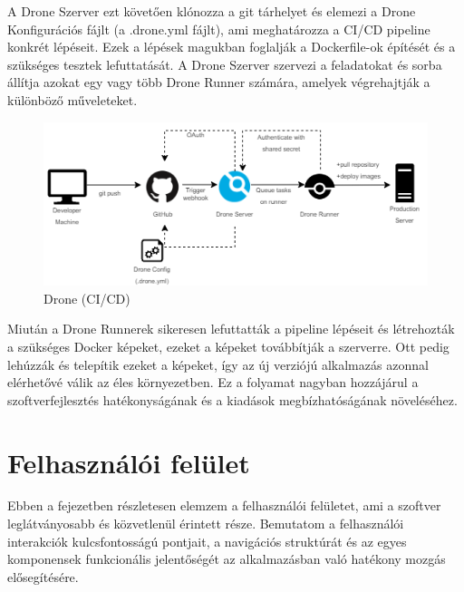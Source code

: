A Drone Szerver ezt követően klónozza a git tárhelyet és elemezi a Drone Konfigurációs fájlt (a .drone.yml fájlt), ami meghatározza a CI/CD pipeline konkrét lépéseit. Ezek a lépések magukban foglalják a Dockerfile-ok építését és a szükséges tesztek lefuttatását. A Drone Szerver szervezi a feladatokat és sorba állítja azokat egy vagy több Drone Runner számára, amelyek végrehajtják a különböző műveleteket.

\begin{figure}[H]
    \centering
    \includegraphics[width=15.0truecm]{images/droneCI.png}
    \caption{Drone (CI/CD)}
    \label{fig:Drone(CI/CD)}
\end{figure}

Miután a Drone Runnerek sikeresen lefuttatták a pipeline lépéseit és létrehozták a szükséges Docker képeket, ezeket a képeket továbbítják a szerverre. Ott pedig lehúzzák és telepítik ezeket a képeket, így az új verziójú alkalmazás azonnal elérhetővé válik az éles környezetben. Ez a folyamat nagyban hozzájárul a szoftverfejlesztés hatékonyságának és a kiadások megbízhatóságának növeléséhez.
\section{Felhaszn\'al\'oi felület}
Ebben a fejezetben részletesen elemzem a felhasználói felületet, ami a szoftver leglátványosabb és közvetlenül érintett része. Bemutatom a felhasználói interakciók kulcsfontosságú pontjait, a navigációs struktúrát és az egyes komponensek funkcionális jelentőségét az alkalmazásban való hatékony mozgás elősegítésére.
